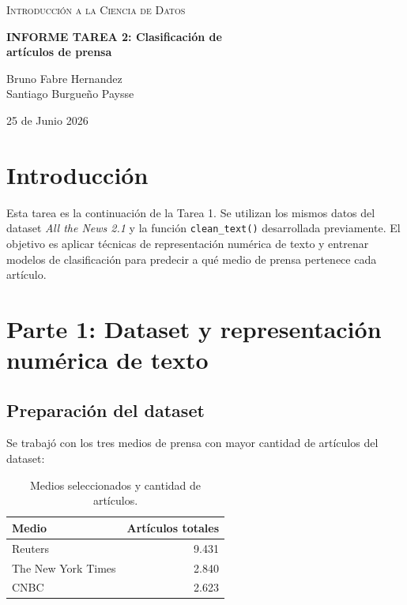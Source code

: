 \documentclass[12pt,a4paper]{article}
\begin{document}
\begin{titlepage}
  \centering
  \vspace*{2cm}
  {\large \textsc{Introducción a la Ciencia de Datos} \par}
  \vspace{1.5cm}
  {\Huge \bfseries INFORME TAREA 2: Clasificación de \\ artículos de prensa \par}
  \vspace{2cm}
  {\large Bruno Fabre Hernandez \\[0.3em] Santiago Burgueño Paysse \par}
  \vspace{2cm}
  {\large 25 de Junio 2026 \par}
  \vfill
\end{titlepage}

\tableofcontents
\newpage

\section*{Introducción}

Esta tarea es la continuación de la Tarea 1. Se utilizan los mismos datos del dataset \textit{All the News 2.1} y la función \texttt{clean\_text()} desarrollada previamente. El objetivo es aplicar técnicas de representación numérica de texto y entrenar modelos de clasificación para predecir a qué medio de prensa pertenece cada artículo.

\section{Parte 1: Dataset y representación numérica de texto}

\subsection{Preparación del dataset}

Se trabajó con los tres medios de prensa con mayor cantidad de artículos del dataset:

\begin{table}[H]
  \centering
  \begin{tabular}{lr}
    \toprule
    \textbf{Medio} & \textbf{Artículos totales} \\
    \midrule
    Reuters & 9.431 \\
    The New York Times & 2.840 \\
    CNBC & 2.623 \\
    \bottomrule
  \end{tabular}
  \caption{Medios seleccionados y cantidad de artículos.}
\end{table}
\end{document}
